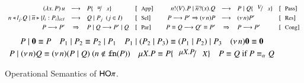 \begin{figure}[!t]
\[
	\begin{array}{rcllcrcll}
		\appl{(\abs{x}{P})}{u}  & \red & P \subst{u}{x} 
		& \orule{App}
		&&
		\bout{n}{V} P \Par \binp{\dual{n}}{x} Q & \red & P \Par Q \subst{V}{x} 
		& \orule{Pass}
		\\[1mm]

		\bsel{n}{l_j} Q \Par \bbra{\dual{n}}{l_i : P_i}_{i \in I} & \red & Q \Par P_j ~~(j \in I)~~ 
		& \orule{Sel}
		&&
		P \red P'\Rightarrow  \news{n} P   & \red  &  \news{n} P' 
		& \orule{Res}
		\\[1mm]

		P \red P' & \Rightarrow  &  P \Par Q  \red   P' \Par Q  
		& \orule{Par}
		&&
		P \scong Q \red Q' \scong P' & \Rightarrow & P  \red  P'
		& \orule{Cong}
	\end{array}
\]
{\small
\[
	\begin{array}{c}
		P \Par \inact \scong P
		\quad
		P_1 \Par P_2 \scong P_2 \Par P_1
		\quad
		P_1 \Par (P_2 \Par P_3) \scong (P_1 \Par P_2) \Par P_3
		\quad
		\news{n} \inact \scong \inact
		\\[1mm]
		P \Par \news{n} Q \scong \news{n}(P \Par Q)
		\ (n \notin \fn{P})
		\quad 
		\recp{X}{P} \scong P\subst{\recp{X}{P}}{\rvar{X}}
		\quad
		P \scong Q \textrm{ if } P \scong_\alpha Q
	\end{array}
\]
}
\vspace{-3mm}
\caption{Operational Semantics of $\mathsf{HO}\pi$. 
\vspace{-1mm}
\label{fig:reduction}}
\end{figure}

